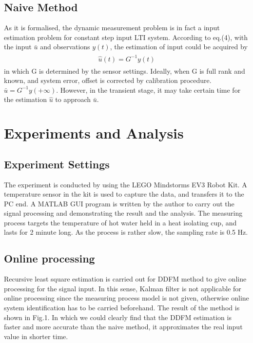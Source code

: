 \documentclass[journal]{IEEEtran}
\begin{document}
\subsection{Naive Method}

As it is formalised, the dynamic measurement problem is in fact a input estimation problem for constant step input LTI system. According to eq.(4), with the input $\bar{u}$ and observations $y(t)$, the estimation of input could be acquired by
\begin{align}
	\begin{split}
		\hat{u}(t) = G^{-1}y(t)
	\end{split}
\end{align}
in which G is determined by the sensor settings. Ideally, when G is full rank and known, and system error, offset is corrected by calibration procedure.\cite{sensor-cep}  $\bar{u} = G^{-1}y(+\infty)$. However, in the transient stage, it may take certain time for the estimation $\hat{u}$ to approach $\bar{u}$. 


\section{Experiments and Analysis}

\subsection{Experiment Settings}

The experiment is conducted by using the LEGO Mindstorms EV3 Robot Kit. A temperature sensor in the kit is used to capture the data, and transfers it to the PC end. A MATLAB GUI program is written by the author to carry out the signal processing and demonstrating the result and the analysis. 
The measuring process targets the temperature of hot water held in a heat isolating cup, and lasts for 2 minute long. As the process is rather slow, the sampling rate is 0.5 Hz.

\subsection{Online processing}

Recursive least square estimation is carried out for DDFM method to give online processing for the signal input. In this sense, Kalman filter is not applicable for online processing since the measuring process model is not given, otherwise online system identification has to be carried beforehand. The result of the method is shown in Fig.1. In which we could clearly find that the DDFM estimation is faster and more accurate than the naive method, it approximates the real input value in shorter time.
\end{document}
